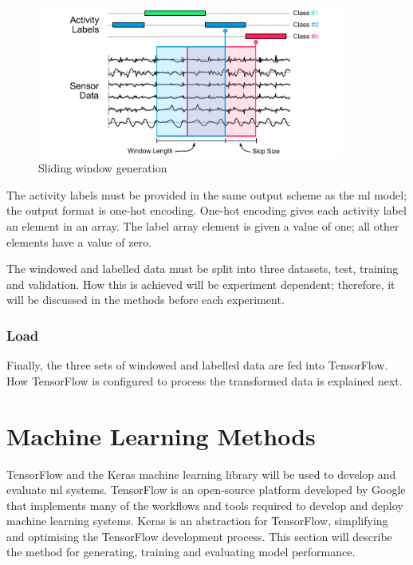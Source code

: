 \begin{figure}[hbt]
    \centering
    \includegraphics[width=0.9\textwidth]{content/3-Methods/Sliding_Window.pdf}
    \caption{Sliding window generation}
    \label{fig:methods-data-window-generation}
\end{figure}

The activity labels must be provided in the same output scheme as the \acrshort{ml} model; the output format is one-hot encoding. One-hot encoding gives each activity label an element in an array. The label array element is given a value of one; all other elements have a value of zero.

The windowed and labelled data must be split into three datasets, test, training and validation. How this is achieved will be experiment dependent; therefore, it will be discussed in the methods before each experiment.

\subsubsection{Load}
Finally, the three sets of windowed and labelled data are fed into TensorFlow. How TensorFlow is configured to process the transformed data is explained next.


\section{Machine Learning Methods}
TensorFlow and the Keras machine learning library will be used to develop and evaluate \acrshort{ml} systems. TensorFlow is an open-source platform developed by Google that implements many of the workflows and tools required to develop and deploy machine learning systems. Keras is an abstraction for TensorFlow, simplifying and optimising the TensorFlow development process. This section will describe the method for generating, training and evaluating model performance.

